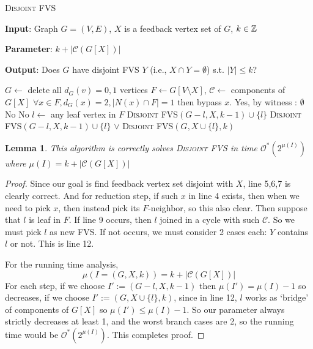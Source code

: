 \documentclass[12pt, a4paper, openany, twoside]{book}
\newtheorem{lem}[thm]{Lemma}
\theoremstyle{definition}
\theoremstyle{remark}
\newcommand{\CC}{{\mathcal {C}}} \newcommand{\CD}{{\mathcal {D}}}
\newcommand{\CO}{{\mathcal {O}}} \newcommand{\CP}{{\mathcal {P}}}
\theoremstyle{plain}
\numberwithin{equation}{section}
\begin{document}
\begin{tcolorbox}[colback=yellow!10!white,colframe=brown!75!black,title=Disjoint FVS]

\textsc{Disjoint FVS}

\textbf{Input}: Graph $G = (V, E)$, $X$ is a feedback vertex set of $G$, $k \in {\mathbb {Z}}$

\textbf{Parameter}: $k + |\CC(G[X])|$

\textbf{Output}: Does $G$ have disjoint FVS $Y$ (i.e., $X \cap Y = \emptyset$) s.t. $|Y| \leq k$?

\end{tcolorbox}

\begin{algorithm} 
\caption{Algorithm for Disjoint FVS}
\begin{algorithmic}[1]
\State $G \gets$ delete all $d_G(v) = 0,1$ vertices  
\State $F \gets G[V \setminus X]$, $\CC \gets$ components of $G[X]$ 
\State $\forall x \in F, d_G(x) = 2, |N(x) \cap F| = 1$ then bypass $x$.
 \Return Yes, by witness : $\emptyset$
\EndIf
{} \Return No      
\EndIf
{} \Return No
\EndIf
\State $l \gets $ any leaf vertex in $F$
\If{$\exists C \in \CC$, $l$ incident $C$ with more than 2 edges}
\State \Return \textsc{Disjoint FVS}$(G - l, X, k-1) \cup \{l\}$
\State \Return \textsc{Disjoint FVS}$(G - l, X, k-1) \cup \{l\}$ $\vee$ \textsc{Disjoint FVS}$(G, X \cup \{l\}, k)$
\EndIf
\EndProcedure
\end{algorithmic}

\end{algorithm}

\begin{lem}
    
This algorithm is correctly solves \textsc{Disjoint FVS} in time $\CO^*(2^{\mu(I)})$ where $\mu(I) = k + |\CC(G[X])|$

\end{lem}

\begin{proof}
    
Since our goal is find feedback vertex set disjoint with $X$, 
line 5,6,7 is clearly correct. And for reduction step, if such $x$ in line 4 exists, then 
when we need to pick $x$, then instead pick its $F$-neighbor, so this also clear. 
Then suppose that $l$ is leaf in $F$. If line 9 occurs, then $l$ joined in a cycle with such $\CC$. So we must pick $l$ as new FVS. 
If not occurs, we must consider 2 cases each: $Y$ contains $l$ or not. This is line 12.

For the running time analysis, 
\[\mu(I = (G, X, k)) = k + |\CC(G[X])|\]
For each step, if we choose $I' := (G - l, X, k - 1)$ then $\mu(I') = \mu(I) - 1$ so decreases, 
if we choose $I' := (G, X \cup \{l\}, k)$, since in line 12, $l$ works as \lq bridge' of components of $G[X]$ so 
$\mu(I') \leq \mu(I) - 1$. So our parameter always strictly decreases at least 1, and the worst branch cases are 2, so the running time would be $\CO^*(2^{\mu(I)})$. 
This completes proof.

\end{proof}
\end{document}

